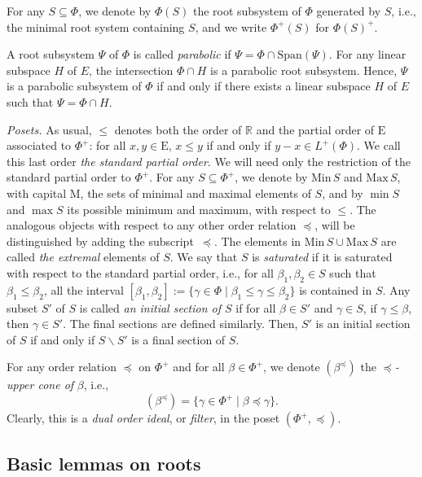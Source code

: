 \documentclass[10pt]{amsart}
\theoremstyle{definition}
\theoremstyle{remark}
\newcommand\smeno{\smallsetminus}
\newcommand\real{\mathbb R}
\newcommand\gen{\mathrm{Span}}
\newcommand\Min{\mathrm{Min}}
\newcommand\Max{\mathrm{Max}}
\newcommand\be{\beta}
\newcommand\ga{\gamma}
\newcommand\preq{\preccurlyeq}
\renewcommand{\leq}{\leqslant}
\begin{document}
\par
For any $S\subseteq \Phi$, we denote by $\Phi(S)$ the root subsystem of $\Phi$ generated by $S$, i.e., the minimal root system containing $S$, and we write  $\Phi^+(S)$ for $\Phi(S)^+$. 

\par
A root subsystem $\Psi$  of $\Phi$ is called {\it parabolic} if
$\Psi=\Phi\cap \gen(\Psi)$.  
For any linear subspace $H$ of $E$, the intersection $\Phi\cap H$ is a parabolic root subsystem.
Hence, $\Psi$ is a parabolic subsystem of $\Phi$ if and only if there exists a linear subspace $H$ of $E$ such that $\Psi=\Phi\cap H$.

\par
{\sl Posets.} As usual, $\leq$ denotes  both the order of $\real$ and the partial order of $\mathrm E$ associated to $\Phi^+$:  for all $x,y\in \mathrm E$,  $x\leq y$ if and only if $y-x\in L^+(\Phi)$.
We call this last order {\it the  standard partial order}.
We will need only the restriction of the standard partial order to $\Phi^+$. 
For any $S\subseteq \Phi^+$, we denote by $\Min\,S$ and $\Max\, S$, with capital M, the sets of minimal and maximal elements of $S$, and by $\min S$ and $\max S$ its possible minimum and maximum, with respect to $\leq$. 
The analogous objects with respect to any other order relation $\preq$, will be distinguished by adding the subscript~$\preq$.
The elements in  $\Min\,S\cup \Max\, S$ are called {\it the extremal} elements of $S$.
We say that $S$  is {\it saturated} if it is saturated with respect to the standard partial order, i.e., for all $\be_1, \be_2\in S$ such that $\be_1\leq \be_2$, all the interval $[\be_1, \be_2]:=\{\ga\in \Phi \mid \be_1\leq \ga\leq \be_2\}$ is contained in $S$.
Any subset $S'$ of $S$ is called {\it an initial section of $S$} if for all $\be\in S'$ and $\ga\in S$, if $\ga \leq \be$, then $\ga \in S'$. 
The final sections are defined similarly. 
Then, $S'$ is an initial section of $S$ if and only if $S\smeno S'$ is a final section of $S$.

\par
For any order relation $\preq$ on $\Phi^+$ and for all $\be\in \Phi^+$, we denote $(\be^\preq)$ the {\it $\preq$-upper cone of} $\be$, i.e., 
$$(\be^\preq)=\{\ga\in \Phi^+\mid \be\preq \ga\}.$$  
Clearly, this is a {\it dual order ideal}, or {\it filter},  in the poset $(\Phi^+,\preq)$.


\subsection{Basic lemmas on roots}\label{ssec:basic-roots}
\end{document}
